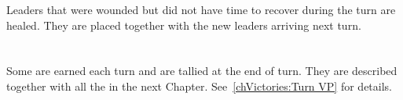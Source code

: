 \label{chInter:No lasting wounds}
 Leaders that were wounded but did not have time to
recover during the turn are healed.
\bparag They are placed together with the new leaders arriving next turn.

\section{\VPs}
\aparag Some \VPs are earned each turn and are tallied at the end of turn.
\bparag They are described together with all the \VPs in the next
Chapter. See~\ref{chVictories:Turn VP} for details.

